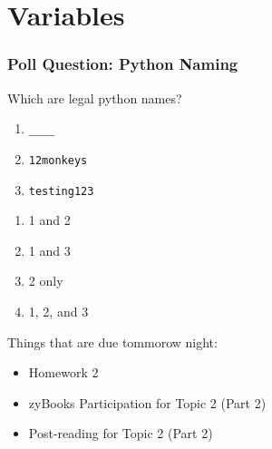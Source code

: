 \documentclass{beamer}
\begin{document}
\section{Variables}

%
%
%
\begin{frame}[fragile]
  \frametitle{Poll Question: Python Naming}
  \begin{minipage}{0.49\textwidth}
    Which are legal python names?
    \begin{enumerate}
      \item \lstinline{____}
      \item \lstinline{12monkeys}
      \item \lstinline{testing123}
    \end{enumerate}
  \end{minipage}
  \begin{minipage}{0.49\textwidth}
    \begin{enumerate}[A]
      \item 1 and 2
      \item 1 and 3
      \item 2 only
      \item 1, 2, and 3
    \end{enumerate}
  \end{minipage}
\end{frame}

%
%
%
\begin{frame}
  Things that are due tommorow night:
    \begin{itemize}
      \item Homework 2
      \item zyBooks Participation for Topic 2 (Part 2) 
      \item Post-reading for Topic 2 (Part 2)
    \end{itemize}
\end{frame}
\end{document}
